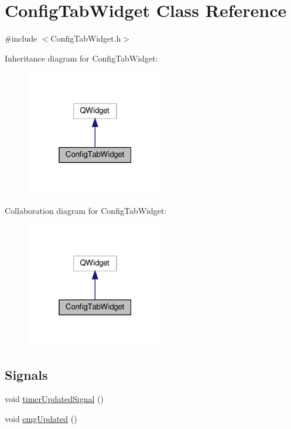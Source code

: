\hypertarget{class_config_tab_widget}{}\section{Config\+Tab\+Widget Class Reference}
\label{class_config_tab_widget}


{\ttfamily \#include $<$Config\+Tab\+Widget.\+h$>$}



Inheritance diagram for Config\+Tab\+Widget\+:
\nopagebreak
\begin{figure}[H]
\begin{center}
\leavevmode
\includegraphics[width=172pt]{class_config_tab_widget__inherit__graph}
\end{center}
\end{figure}


Collaboration diagram for Config\+Tab\+Widget\+:
\nopagebreak
\begin{figure}[H]
\begin{center}
\leavevmode
\includegraphics[width=172pt]{class_config_tab_widget__coll__graph}
\end{center}
\end{figure}
\subsection*{Signals}
\begin{DoxyCompactItemize}
\item 
void \hyperlink{class_config_tab_widget_abad08be885f5a573aaf03da16bcd69ef}{timer\+Updated\+Signal} ()
\item 
void \hyperlink{class_config_tab_widget_a94e2bd6114c6d5995b46e3a1ac6accc2}{emg\+Updated} ()
\end{DoxyCompactItemize}
